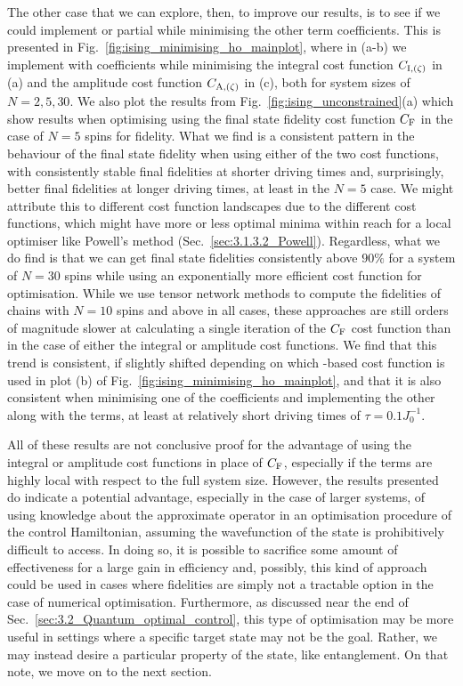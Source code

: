 The other case that we can explore, then, to improve our results, is to see if we could implement  or partial   while minimising the other  term coefficients. This is presented in Fig.~\ref{fig:ising_minimising_ho_mainplot}, where in (a-b) we implement  with   coefficients while minimising the integral cost function $C_{\rm I, (\zeta)}$ in (a) and the amplitude cost function $C_{\rm A, (\zeta)}$ in (c), both for system sizes of $N = 2, 5, 30$. We also plot the results from Fig.~\ref{fig:ising_unconstrained}(a) which show results when optimising  using the final state fidelity cost function $C_{\rm F}$ in the case of $N = 5$ spins for fidelity. What we find is a consistent pattern in the behaviour of the final state fidelity when using either of the two cost functions, with consistently stable final fidelities at shorter driving times and, surprisingly, better final fidelities at longer driving times, at least in the $N=5$ case. We might attribute this to different cost function landscapes due to the different cost functions, which might have more or less optimal minima within reach for a local optimiser like Powell's method (Sec.~\ref{sec:3.1.3.2_Powell}). Regardless, what we do find is that we can get final state fidelities consistently above $90\%$ for a system of $N=30$ spins while using an exponentially more efficient cost function for optimisation. While we use tensor network methods to compute the fidelities of chains with $N=10$ spins and above in all cases, these approaches are still orders of magnitude slower at calculating a single iteration of the $C_{\rm F}$ cost function than in the case of either the integral or amplitude cost functions. We find that this trend is consistent, if slightly shifted depending on which -based cost function is used in plot (b) of Fig.~\ref{fig:ising_minimising_ho_mainplot}, and that it is also consistent when minimising one of the  coefficients and implementing the other along with the  terms, at least at relatively short driving times of $\tau = 0.1J_0^{-1}$.

All of these results are not conclusive proof for the advantage of using the integral or amplitude cost functions in place of $C_{\rm F}$, especially if the  terms are highly local with respect to the full system size. However, the results presented do indicate a potential advantage, especially in the case of larger systems, of using knowledge about the approximate  operator in an optimisation procedure of the control Hamiltonian, assuming the wavefunction of the state is prohibitively difficult to access. In doing so, it is possible to sacrifice some amount of effectiveness for a large gain in efficiency and, possibly, this kind of approach could be used in cases where fidelities are simply not a tractable option in the case of numerical optimisation. Furthermore, as discussed near the end of Sec.~\ref{sec:3.2_Quantum_optimal_control}, this type of optimisation may be more useful in settings where a specific target state may not be the goal. Rather, we may instead desire a particular property of the state, like entanglement. On that note, we move on to the next section.

